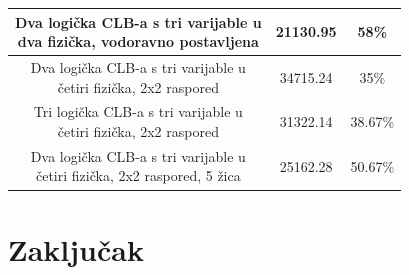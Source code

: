 \documentclass[times, utf8, zavrsni]{fer}
\begin{document}
\begin{table}[htb]
\begin{tabular}{|c | c| c|}
				\makecell{Dva logička CLB-a s tri varijable u \\ dva fizička, vodoravno postavljena} & 21130.95 & 58\%\\ \hline
				\makecell{Dva logička CLB-a s tri varijable u \\ četiri fizička, 2x2 raspored} & 34715.24 & 35\% \\ \hline
				\makecell{Tri logička CLB-a s tri varijable u \\ četiri fizička, 2x2 raspored} & 31322.14 & 38.67\% \\ \hline
				\makecell{Dva logička CLB-a s tri varijable u \\ četiri fizička, 2x2 raspored, 5 žica} & 25162.28 & 50.67\% \\ \hline
			\end{tabular}
		\end{table}
		
		
		\chapter{Zaključak}
		
\end{document}
